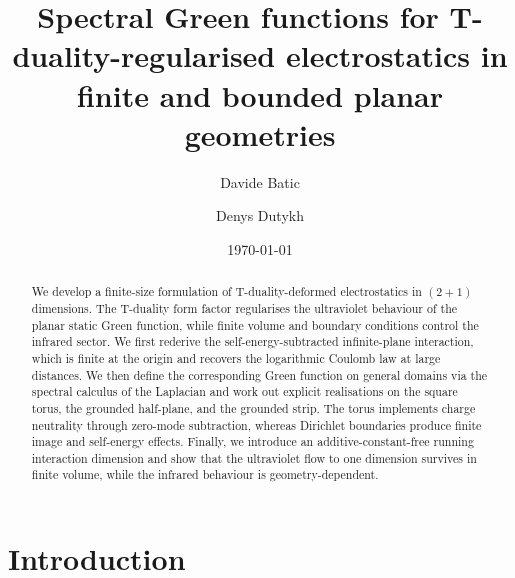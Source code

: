 \documentclass[nopacs,amsmath,amsfonts,amssymb,aps,superscriptaddress]{revtex4}
\begin{document}
\title{Spectral Green functions for T-duality-regularised electrostatics in finite and bounded planar geometries}

\author{Davide Batic}

\author{Denys Dutykh}
\date{\today}

\begin{abstract}
We develop a finite-size formulation of T-duality-deformed electrostatics in $(2+1)$ dimensions. The T-duality form factor regularises the ultraviolet behaviour of the planar static Green function, while finite volume and boundary conditions control the infrared sector. We first rederive the self-energy-subtracted infinite-plane interaction, which is finite at the origin and recovers the logarithmic Coulomb law at large distances. We then define the corresponding Green function on general domains via the spectral calculus of the Laplacian and work out explicit realisations on the square torus, the grounded half-plane, and the grounded strip. The torus implements charge neutrality through zero-mode subtraction, whereas Dirichlet boundaries produce finite image and self-energy effects. Finally, we introduce an additive-constant-free running interaction dimension and show that the ultraviolet flow to one dimension survives in finite volume, while the infrared behaviour is geometry-dependent.
\end{abstract}

\maketitle

\section{Introduction}
\end{document}
